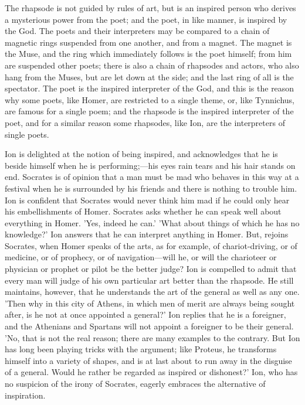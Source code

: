 \documentclass[11pt,letter]{article}
\begin{document}
\par  The rhapsode is not guided by rules of art, but is an inspired person who derives a mysterious power from the poet; and the poet, in like manner, is inspired by the God. The poets and their interpreters may be compared to a chain of magnetic rings suspended from one another, and from a magnet. The magnet is the Muse, and the ring which immediately follows is the poet himself; from him are suspended other poets; there is also a chain of rhapsodes and actors, who also hang from the Muses, but are let down at the side; and the last ring of all is the spectator. The poet is the inspired interpreter of the God, and this is the reason why some poets, like Homer, are restricted to a single theme, or, like Tynnichus, are famous for a single poem; and the rhapsode is the inspired interpreter of the poet, and for a similar reason some rhapsodes, like Ion, are the interpreters of single poets.

\par  Ion is delighted at the notion of being inspired, and acknowledges that he is beside himself when he is performing;—his eyes rain tears and his hair stands on end. Socrates is of opinion that a man must be mad who behaves in this way at a festival when he is surrounded by his friends and there is nothing to trouble him. Ion is confident that Socrates would never think him mad if he could only hear his embellishments of Homer. Socrates asks whether he can speak well about everything in Homer. 'Yes, indeed he can.' 'What about things of which he has no knowledge?' Ion answers that he can interpret anything in Homer. But, rejoins Socrates, when Homer speaks of the arts, as for example, of chariot-driving, or of medicine, or of prophecy, or of navigation—will he, or will the charioteer or physician or prophet or pilot be the better judge? Ion is compelled to admit that every man will judge of his own particular art better than the rhapsode. He still maintains, however, that he understands the art of the general as well as any one. 'Then why in this city of Athens, in which men of merit are always being sought after, is he not at once appointed a general?' Ion replies that he is a foreigner, and the Athenians and Spartans will not appoint a foreigner to be their general. 'No, that is not the real reason; there are many examples to the contrary. But Ion has long been playing tricks with the argument; like Proteus, he transforms himself into a variety of shapes, and is at last about to run away in the disguise of a general. Would he rather be regarded as inspired or dishonest?' Ion, who has no suspicion of the irony of Socrates, eagerly embraces the alternative of inspiration.
\end{document}

